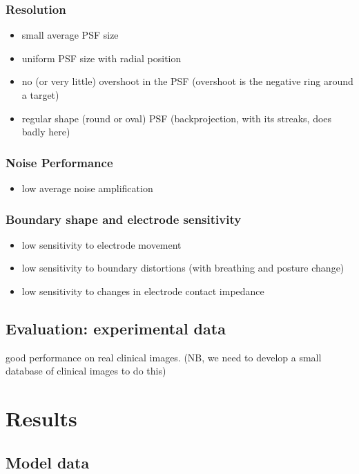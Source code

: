 \documentclass[letterpaper,twocolumn,11pt]{article}
\begin{document}
\subsubsection{ Resolution}
   \begin{itemize}
   \item small average PSF size
   \item uniform PSF size with radial position
   \item no (or very little) overshoot in the PSF
  (overshoot is the negative ring around a target)
   \item regular shape (round or oval) PSF
  (backprojection, with its streaks, does badly here)
   \end{itemize}

\subsubsection{ Noise Performance}
   \begin{itemize}
   \item low average noise amplification
   \end{itemize}

\subsubsection{ Boundary shape and electrode sensitivity}
   \begin{itemize}
   \item low sensitivity to electrode movement
   \item low sensitivity to boundary distortions
         (with breathing and posture change)
   \item low sensitivity to changes in electrode contact impedance
   \end{itemize}


\subsection{Evaluation: experimental data}


 good performance on real clinical images.
     (NB, we need to develop a small database of 
          clinical images to do this)

\section{Results}
\subsection{Model data}
\end{document}
